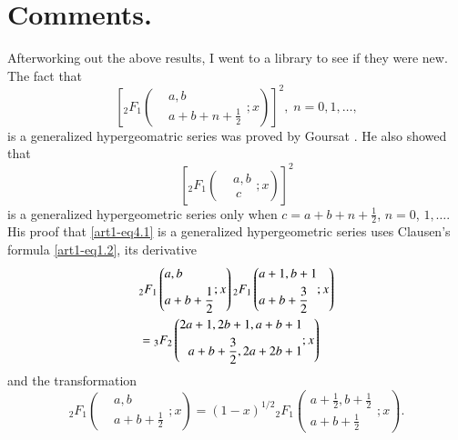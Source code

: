 \section{Comments.}\label{art1-sec4}
After\pageoriginale working out the above results, I went to a library to see if they were new. The fact that
\setcounter{equation}{0}
\begin{equation}
\left[{}_2 F_1 
\left(\begin{aligned}
& a, b\\
&  a+b +n + \frac{1}{2}
\end{aligned} ; x
\right)
\right]^2 , \; n = 0, 1, \ldots,
\label{art1-eq4.1}
\end{equation}
is a generalized hypergeomatric series was proved by Goursat \cite{art1-key8}. He also showed that
$$
\left[{}_2 F_1 \left(\begin{aligned}
& a, b\\
& ~ c
\end{aligned} ;x
\right) \right]^2
$$
is a generalized hypergeometric series only when $c = a + b+ n + \frac{1}{2}$, $n = 0$, $1, \ldots$. His proof that \eqref{art1-eq4.1} is a generalized hypergeometric series uses Clausen's formula \eqref{art1-eq1.2}, its derivative 
\begin{align}
& {}_2 F_1 
\left(
\begin{aligned}
&a, b\\
&  a+ b + \frac{1}{2}
\end{aligned} ;x
\right) {}_2 F_1 
\left(
\begin{aligned}
& a+ 1, b +1\\
& a + b + \frac{3}{2}
\end{aligned};x\right) \\
&= {}_3 F_2 
\left(
\begin{aligned}
2a + 1, 2b + 1, a+b +1\\
a+b + \frac{3}{2}, 2a + 2b +1 
\end{aligned};x
\right)
 \notag
\end{align}
and the transformation
$$
{}_2 F_1 
\left(
\begin{aligned}
& a, b\\
& a+ b + \frac{1}{2}
\end{aligned} ; x
 \right) = (1-x)^{1/2}
{}_2 F_1 
\left(
\begin{aligned}
a+ \frac{1}{2}, b + \frac{1}{2}\\
a+b+\frac{1}{2}
\end{aligned};x
\right).
$$
